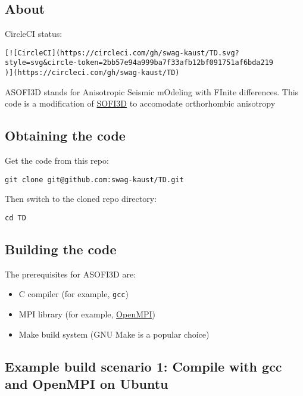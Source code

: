 \subsection{About}\label{about}

CircleCI status:

\begin{verbatim}
[![CircleCI](https://circleci.com/gh/swag-kaust/TD.svg?style=svg&circle-token=2bb57e94a999ba7f33afb12bf091751af6bda219
)](https://circleci.com/gh/swag-kaust/TD)
\end{verbatim}

ASOFI3D stands for Anisotropic Seismic mOdeling with FInite differences.
This code is a modification of
\href{https://git.scc.kit.edu/GPIAG-Software/SOFI3D/wikis/home}{SOFI3D}
to accomodate orthorhombic anisotropy

\subsection{Obtaining the code}\label{obtaining-the-code}

Get the code from this repo:

\begin{verbatim}
git clone git@github.com:swag-kaust/TD.git
\end{verbatim}

Then switch to the cloned repo directory:

\begin{verbatim}
cd TD
\end{verbatim}

\subsection{Building the code}\label{building-the-code}

The prerequisites for ASOFI3D are:

\begin{itemize}
\tightlist
\item
  C compiler (for example, \texttt{gcc})
\item
  MPI library (for example, \href{https://www.open-mpi.org/}{OpenMPI})
\item
  Make build system (GNU Make is a popular choice)
\end{itemize}

\subsection{Example build scenario 1: Compile with gcc and OpenMPI on
Ubuntu}\label{example-build-scenario-1-compile-with-gcc-and-openmpi-on-ubuntu}

